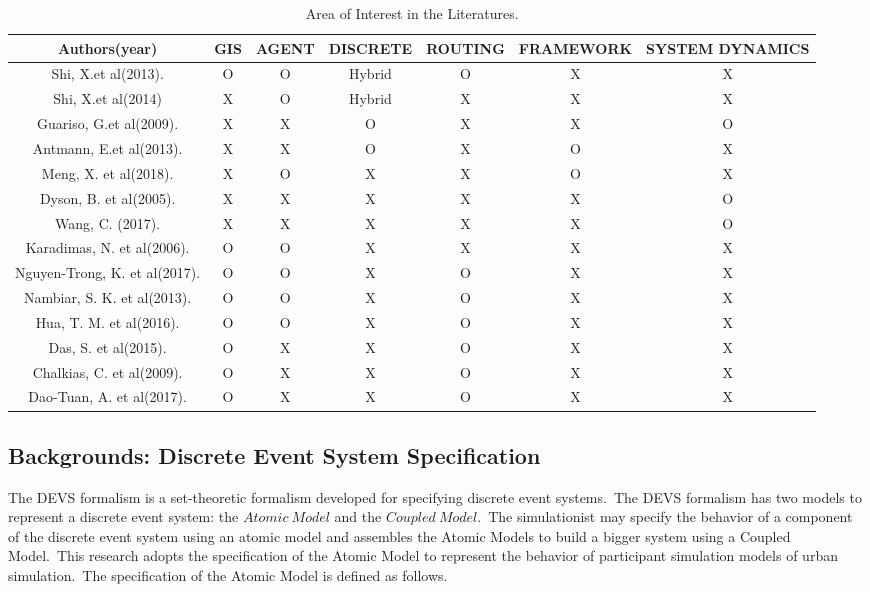 \documentclass{scsSimAUDPaperFormat}
\begin{document}
\begin{table}[ht]
\centering
\caption{Area of Interest in the Literatures.}
\begin{tabular}{|c|c|c|c|c|c|c|}
\hline
Authors(year) & GIS & AGENT & DISCRETE & ROUTING & FRAMEWORK & SYSTEM DYNAMICS \\
\hline
Shi, X.et al(2013). & O & O & Hybrid & O & X & X \\
Shi, X.et al(2014) & X & O & Hybrid & X & X & X \\
Guariso, G.et al(2009). & X & X & O & X & X & O \\
Antmann, E.et al(2013). & X & X & O & X & O & X \\
Meng, X. et al(2018). & X & O & X & X & O & X \\
Dyson, B. et al(2005). & X & X & X & X & X & O \\
Wang, C. (2017). & X & X & X & X & X & O \\
Karadimas, N. et al(2006). & O & O & X & X & X & X \\
Nguyen-Trong, K. et al(2017). & O & O & X & O & X & X \\
Nambiar, S. K. et al(2013). & O & O & X & O & X & X \\
Hua, T. M. et al(2016). & O & O & X & O & X & X \\
Das, S. et al(2015). & O & X & X & O & X & X \\
Chalkias, C. et al(2009). & O & X & X & O & X & X \\
Dao-Tuan, A. et al(2017). & O & X & X & O & X & X \\
\hline
\end{tabular}
\label{tab:Literatures}
\end{table}




\subsection{Backgrounds: Discrete Event System Specification}
The DEVS formalism is a set-theoretic formalism developed for specifying discrete event systems.~The DEVS formalism has two models to represent a discrete event system: the $Atomic~Model$ and the $Coupled~Model$.~The simulationist may specify the behavior of a component of the discrete event system using an atomic model and assembles the Atomic Models to build a bigger system using a Coupled Model.~This research adopts the specification of the Atomic Model to represent the behavior of participant simulation models of urban simulation.~The specification of the Atomic Model is defined as follows.
\end{document}
